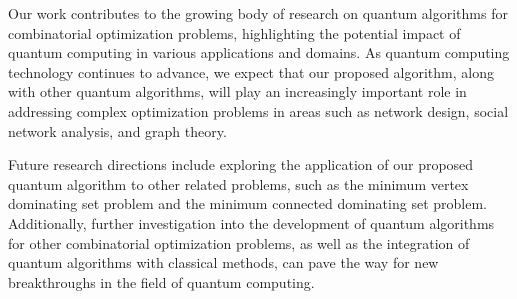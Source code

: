 Our work contributes to the growing body of research on quantum algorithms for combinatorial optimization problems, highlighting the potential impact of quantum computing in various applications and domains. As quantum computing technology continues to advance, we expect that our proposed algorithm, along with other quantum algorithms, will play an increasingly important role in addressing complex optimization problems in areas such as network design, social network analysis, and graph theory.

Future research directions include exploring the application of our proposed quantum algorithm to other related problems, such as the minimum vertex dominating set problem and the minimum connected dominating set problem. Additionally, further investigation into the development of quantum algorithms for other combinatorial optimization problems, as well as the integration of quantum algorithms with classical methods, can pave the way for new breakthroughs in the field of quantum computing.

